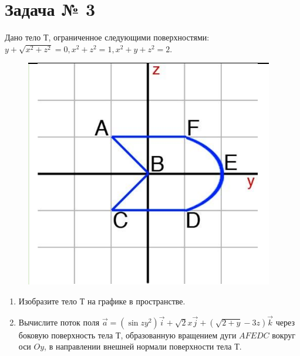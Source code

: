 \section{Задача № 3}

Дано тело Т, ограниченное следующими поверхностями: $y+\sqrt{x^2+z^2}=0, x^2+z^2=1, x^2+y+z^2=2$.

\begin{figure}[!htbp]
  \centering
  \includegraphics[scale=0.5]{images/Input_task3.png}
\end{figure}

\begin{enumerate}
  \item Изобразите тело Т на графике в пространстве.
  \item Вычислите поток поля $\Vec{a} = ( \sin{zy^2})\Vec{i} + \sqrt{2}x\Vec{j} + (\sqrt{2+y}-3z)\Vec{k}$ через боковую поверхность тела Т, образованную вращением дуги $AFEDC$ вокруг оси $Oy$, в направлении внешней нормали поверхности тела Т.
\end{enumerate}

